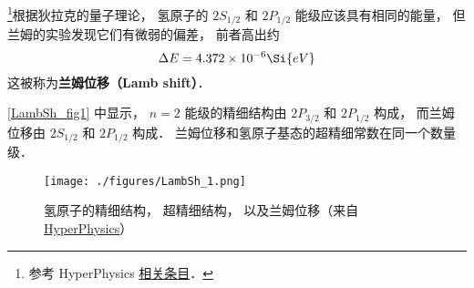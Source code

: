 
\footnote{参考 HyperPhysics \href{http://hyperphysics.phy-astr.gsu.edu/hbase/quantum/lamb.html}{相关条目}．}根据狄拉克的量子理论， 氢原子的 $2S_{1/2}$ 和 $2P_{1/2}$ 能级应该具有相同的能量， 但兰姆的实验发现它们有微弱的偏差， 前者高出约
\begin{equation}
\Delta E = 4.372\times 10^{-6} \Si{eV}
\end{equation}
这被称为\textbf{兰姆位移（Lamb shift）}．

\autoref{LambSh_fig1} 中显示， $n=2$ 能级的精细结构由 $2P_{3/2}$ 和 $2P_{1/2}$ 构成， 而兰姆位移由 $2S_{1/2}$ 和 $2P_{1/2}$ 构成． 兰姆位移和氢原子基态的超精细常数在同一个数量级． 
\begin{figure}[ht]
\centering
\texttt{[image: ./figures/LambSh\_1.png]}
\caption{氢原子的精细结构， 超精细结构， 以及兰姆位移（来自 \href{http://hyperphysics.phy-astr.gsu.edu/hbase/quantum/lamb.html}{HyperPhysics}）} \label{LambSh_fig1}
\end{figure}
